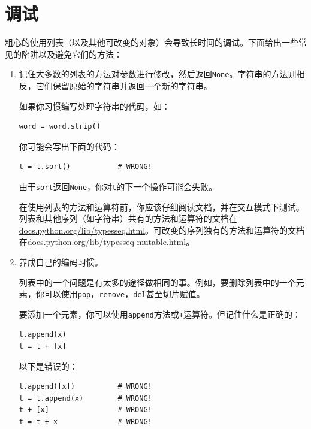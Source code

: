 \section{调试}

粗心的使用列表（以及其他可改变的对象）会导致长时间的调试。下面给出一些常见的陷阱以及避免它们的方法：

\begin{enumerate}

\item 记住大多数的列表的方法对参数进行修改，然后返回{\tt None}。字符串的方法则相反，它们保留原始的字符串并返回一个新的字符串。

如果你习惯编写处理字符串的代码，如：

\beforeverb
\begin{verbatim}
word = word.strip()
\end{verbatim}
\afterverb

你可能会写出下面的代码：

\beforeverb
\begin{verbatim}
t = t.sort()           # WRONG!
\end{verbatim}
\afterverb


由于{\tt sort}返回{\tt None}，你对{\tt t}的下一个操作可能会失败。

在使用列表的方法和运算符前，你应该仔细阅读文档，并在交互模式下测试。列表和其他序列（如字符串）共有的方法和运算符的文档在\url{docs.python.org/lib/typesseq.html}。可改变的序列独有的方法和运算符的文档在\url{docs.python.org/lib/typesseq-mutable.html}。


\item 养成自己的编码习惯。

列表中的一个问题是有太多的途径做相同的事。例如，要删除列表中的一个元素，你可以使用{\tt pop}，{\tt remove}，{\tt del}甚至切片赋值。

要添加一个元素，你可以使用{\tt append}方法或{\tt +}运算符。但记住什么是正确的：

\beforeverb
\begin{verbatim}
t.append(x)
t = t + [x]
\end{verbatim}
\afterverb

以下是错误的：

\beforeverb
\begin{verbatim}
t.append([x])          # WRONG!
t = t.append(x)        # WRONG!
t + [x]                # WRONG!
t = t + x              # WRONG!
\end{verbatim}
\afterverb


\end{enumerate}
